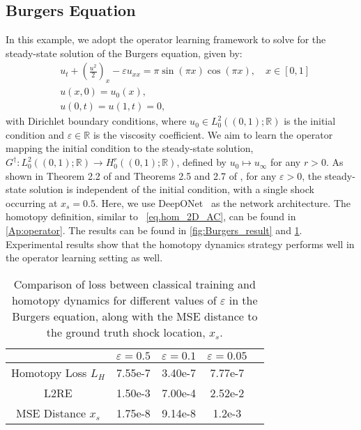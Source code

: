 \subsection{Burgers Equation}
In this example, we adopt the operator learning framework to solve for the steady-state solution of the Burgers equation, given by:
\begin{align}
& u_t+\left(\frac{u^2}{2}\right)_x - \varepsilon u_{xx}=\pi \sin (\pi x) \cos (\pi x), \quad x \in[0, 1]\nonumber\\
& u(x, 0)=u_0(x),\label{eq:1D_Burgers} \\
& u(0, t)=u(1, t)=0, \nonumber 
\end{align}
with Dirichlet boundary conditions, where $u_0 \in L_{0}^2((0, 1); \mathbb{R})$ is the initial condition and $\varepsilon \in \mathbb{R}$ is the viscosity coefficient. We aim to learn the operator mapping the initial condition to the steady-state solution, $G^{\dagger}: L_{0}^2((0, 1); \mathbb{R}) \rightarrow H_{0}^r((0, 1); \mathbb{R})$, defined by $u_0 \mapsto u_{\infty}$ for any $r > 0$. As shown in Theorem 2.2 of \cite{KREISS1986161} and Theorems 2.5 and 2.7 of \cite{hao2019convergence}, for any $\varepsilon > 0$, the steady-state solution is independent of the initial condition, with a single shock occurring at $x_s = 0.5$. Here, we use DeepONet~\cite{lu2021deeponet} as the network architecture. 
The homotopy definition, similar to ~\cref{eq.hom_2D_AC}, can be found in \cref{Ap:operator}. The results can be found in \cref{fig:Burgers_result} and \cref{tab:loss_burgers}. Experimental results show that the homotopy dynamics strategy performs well in the operator learning setting as well.


\begin{table}[htbp!]
    \caption{Comparison of loss between classical training and homotopy dynamics for different values of $\varepsilon$ in the Burgers equation, along with the MSE distance to the ground truth shock location, $x_s$.}
    \vskip 0.15in
    \centering
    \tiny
    \begin{tabular}{|c|c|c|c|c|} 
    \hline  
    $ $ & $\varepsilon = 0.5$ & $\varepsilon = 0.1$ & $\varepsilon = 0.05$ \\ \hline 
    Homotopy Loss $L_H$                &  7.55e-7     & 3.40e-7     & 7.77e-7       \\ \hline 
    L2RE                      & 1.50e-3     & 7.00e-4     & 2.52e-2       \\ \hline
        MSE Distance $x_s$                      & 1.75e-8     & 9.14e-8      & 1.2e-3      \\ \hline
    \end{tabular}
    \label{tab:loss_burgers}
\end{table}



